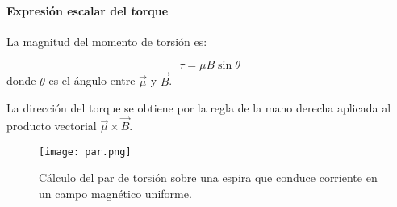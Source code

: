 \paragraph{Expresión escalar del torque}

La magnitud del momento de torsión es:

\begin{equation}
  \boxed{\tau = \mu B\sin\theta}
\end{equation}
donde \(\theta\) es el ángulo entre \(\vec{\mu}\) y \(\vec{B}\).
\begin{tcolorbox}[myconclusion]
  La dirección del torque se obtiene por la regla de la mano derecha aplicada al producto vectorial \(\vec{\mu} \times \vec{B}\).
\end{tcolorbox}
\begin{figure}[ht]
  \centering
  \texttt{[image: par.png]}
  \caption{Cálculo del par de torsión sobre una espira que conduce corriente en un campo magnético uniforme.}
\end{figure}